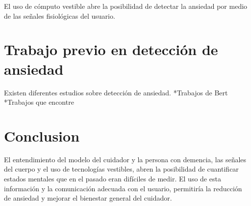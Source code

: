 El uso de c\'omputo vestible abre la posibilidad de detectar la ansiedad por medio de las se\~nales fisiol\'ogicas del usuario.

\section{Trabajo previo en detecci\'on de ansiedad}

Existen diferentes estudios sobre detecci\'on de ansiedad.
*Trabajos de Bert
*Trabajos que encontre

\section{Conclusion}\label{secc:conclution}
El entendimiento del modelo del cuidador y la persona con demencia, las se\~nales del cuerpo y el uso de tecnolog\'ias vestibles, abren la posibilidad de cuantificar estados mentales que en el pasado eran dif\'iciles de medir. El uso de esta informaci\'on y la comunicaci\'on adecuada con el usuario, permitir\'ia la reducci\'on de ansiedad y mejorar el bienestar general del cuidador.

\newpage

